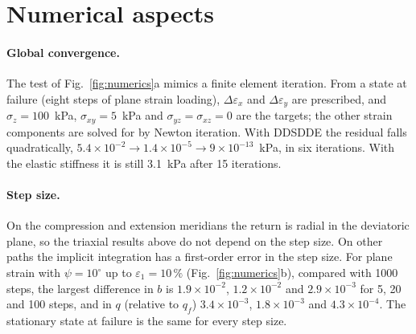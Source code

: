 \documentclass[11pt,a4paper]{article}
\begin{document}
\section{Numerical aspects}
\label{sec:numerics}

\paragraph{Global convergence.} The test of Fig.~\ref{fig:numerics}a mimics a finite element
iteration. From a state at failure (eight steps of plane strain loading), $\Delta\varepsilon_x$
and $\Delta\varepsilon_y$ are prescribed, and $\sigma_z = 100$~kPa, $\sigma_{xy} = 5$~kPa and
$\sigma_{yz} = \sigma_{xz} = 0$ are the targets; the other strain components are solved for by
Newton iteration. With DDSDDE the residual falls quadratically,
$5.4\times10^{-2} \to 1.4\times10^{-5} \to 9\times10^{-13}$~kPa, in six iterations. With the
elastic stiffness it is still 3.1~kPa after 15 iterations.

\paragraph{Step size.} On the compression and extension meridians the return is radial in the
deviatoric plane, so the triaxial results above do not depend on the step size. On other paths
the implicit integration has a first-order error in the step size. For plane strain with
$\psi = 10^\circ$ up to $\varepsilon_1 = 10\,\%$ (Fig.~\ref{fig:numerics}b), compared with 1000
steps, the largest difference in $b$ is $1.9\times10^{-2}$, $1.2\times10^{-2}$ and
$2.9\times10^{-3}$ for 5, 20 and 100 steps, and in $q$ (relative to $q_f$)
$3.4\times10^{-3}$, $1.8\times10^{-3}$ and $4.3\times10^{-4}$. The stationary state at failure is
the same for every step size.
\end{document}
